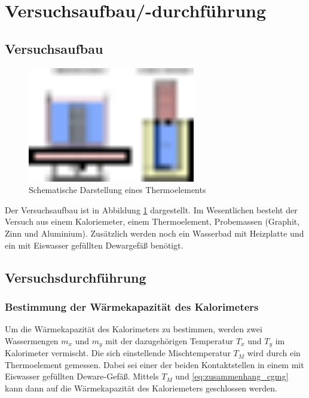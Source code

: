 \section{Versuchsaufbau/-durchführung}

\subsection{Versuchsaufbau}
\begin{figure}
  \centering
  \includegraphics[width=0.65\textwidth]{bilder/versuchsaufbau_dulon_peptip.pdf}
  \caption{Schematische Darstellung eines Thermoelements}
  \label{fig:aufbau}
\end{figure}
Der Versuchsaufbau ist in Abbildung \ref{fig:aufbau} dargestellt.
Im Wesentlichen besteht der Versuch aus einem Kaloriemeter, einem Thermoelement,
Probemassen (Graphit, Zinn und Aluminium).
Zusätzlich werden noch ein Wasserbad mit Heizplatte und
ein mit Eiswasser gefüllten Dewargefäß benötigt.

\subsection{Versuchsdurchführung}

\subsubsection{Bestimmung der Wärmekapazität des Kalorimeters}
Um die Wärmekapazität des Kalorimeters zu bestimmen, werden 
zwei Wassermengen $m_x$ und $m_y$ mit der dazugehörigen Temperatur $T_x$ und $T_y$ 
im Kalorimeter vermischt. 
Die sich einstellende Mischtemperatur $T_M$ wird durch ein Thermoelement gemessen.
Dabei sei einer der beiden Kontaktstellen
in einem mit Eiswasser gefüllten Deware-Gefäß.
Mittels $T_M$ und \eqref{eq:zusammenhang_cgmg} kann dann auf die Wärmekapazität des 
Kaloriemeters geschlossen werden.

